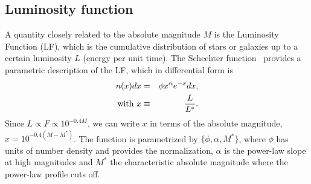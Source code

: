 \subsection{Luminosity function}
A quantity closely related to the absolute magnitude $M$ is the Luminosity Function (LF), which is the cumulative distribution of stars or galaxies up to a certain luminosity $L$ (energy per unit time). The Schechter function~\citep{Schechter1976} provides a parametric description of the LF, which in differential form is
\begin{eqnarray}
n(x)dx &=& \phi x^\alpha e^{-x}dx, \\
\mbox{with}\ x &\equiv& {L \over L^*}.
\end{eqnarray}
Since $L \propto F \propto 10^{-0.4M}$, we can write $x$ in terms of the absolute magnitude, $x = 10^{-0.4(M-M^*)}$. The function is parametrized by $\lbrace \phi, \alpha, M^*  \rbrace$, where $\phi$ has units of number density and provides the normalization, $\alpha$ is the power-law slope at high magnitudes and $M^*$ the characteristic absolute magnitude where the power-law profile cuts off.

